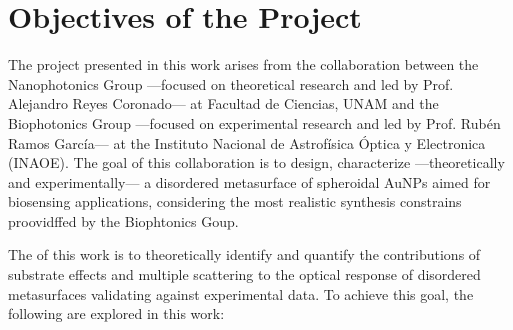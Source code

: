 
\section*{Objectives of the Project}

The project presented in this work arises from the collaboration  between the Nanophotonics Group ---focused on theoretical research and led by Prof. Alejandro Reyes Coronado--- at Facultad de Ciencias, UNAM and the Biophotonics Group ---focused on experimental research and led by Prof. Rubén Ramos García--- at the Instituto Nacional de Astrofísica Óptica y Electronica (INAOE). The goal of this collaboration is to design, characterize ---theoretically and experimentally--- a disordered  metasurface of spheroidal AuNPs aimed for biosensing applications, considering the most realistic synthesis constrains proovidffed by the Biophtonics Goup.

The  of this work is to theoretically identify and quantify the contributions of substrate effects and multiple scattering to the optical response of  disordered metasurfaces validating against experimental data. To achieve this goal, the following  are explored in this work:

